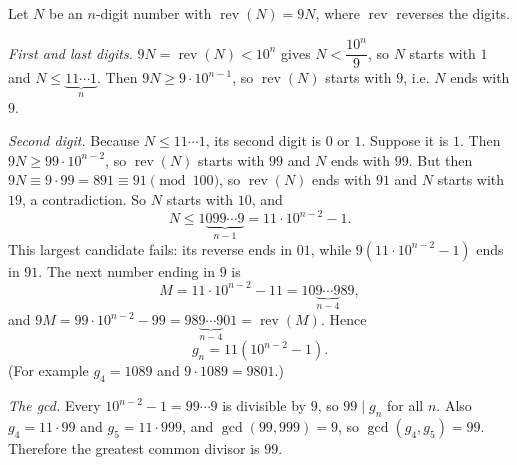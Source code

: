 Let $N$ be an $n$-digit number with $\operatorname{rev}(N)=9N$, where $\operatorname{rev}$ reverses the digits.

\emph{First and last digits.} $9N=\operatorname{rev}(N)<10^n$ gives $N<\dfrac{10^n}{9}$, so $N$ starts with $1$ and $N\le\underbrace{11\cdots1}_{n}$. Then $9N\ge9\cdot10^{n-1}$, so $\operatorname{rev}(N)$ starts with $9$, i.e. $N$ ends with $9$.

\emph{Second digit.} Because $N\le11\cdots1$, its second digit is $0$ or $1$. Suppose it is $1$. Then $9N\ge99\cdot10^{n-2}$, so $\operatorname{rev}(N)$ starts with $99$ and $N$ ends with $99$. But then $9N\equiv9\cdot99=891\equiv91\pmod{100}$, so $\operatorname{rev}(N)$ ends with $91$ and $N$ starts with $19$, a contradiction. So $N$ starts with $10$, and
\[N\le1\underbrace{099\cdots9}_{n-1}=11\cdot10^{n-2}-1.\]
This largest candidate fails: its reverse ends in $01$, while $9\left(11\cdot10^{n-2}-1\right)$ ends in $91$. The next number ending in $9$ is
\[M=11\cdot10^{n-2}-11=10\underbrace{9\cdots9}_{n-4}89,\]
and $9M=99\cdot10^{n-2}-99=98\underbrace{9\cdots9}_{n-4}01=\operatorname{rev}(M)$. Hence
\[g_n=11\left(10^{n-2}-1\right).\]
(For example $g_4=1089$ and $9\cdot1089=9801$.)

\emph{The gcd.} Every $10^{n-2}-1=99\cdots9$ is divisible by $9$, so $99\mid g_n$ for all $n$. Also $g_4=11\cdot99$ and $g_5=11\cdot999$, and $\gcd(99,999)=9$, so $\gcd(g_4,g_5)=99$. Therefore the greatest common divisor is $\boxed{99}$.
